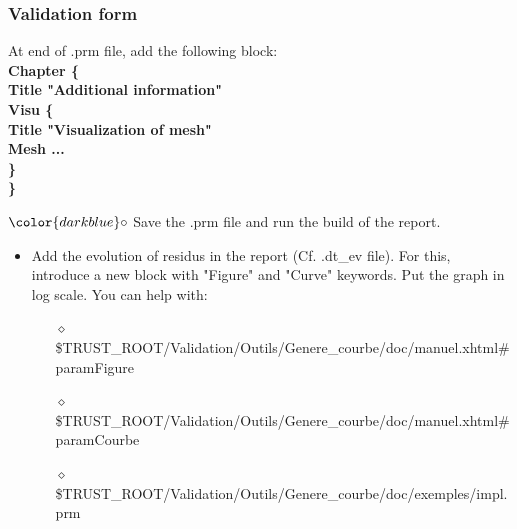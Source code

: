 \documentclass[10pt]{beamer}
\begin{document}
\begin{frame}
\frametitle{Validation form}
\begin{block}{}

\hspace{1.3cm} {\small{At end of .prm file, add the following block:}} \\
{\footnotesize{
\hspace{1.5cm} \textbf{Chapter \{ }  \\
\hspace{1.8cm} \textbf{Title "Additional information"} \\
\hspace{1.8cm} \textbf{Visu \{ } \\
\hspace{2cm} \textbf{Title "Visualization of mesh" } \\
\hspace{2cm} \textbf{Mesh ... } \\
\hspace{1.8cm} \textbf{\} } \\
\hspace{1.5cm} \textbf{\} } \\
}}

\hspace{1cm} $\color{darkblue}\circ$ {\small{ Save the .prm file and run the build of the report.}}

\begin{itemize}
\item Add the evolution of residus in the report (Cf. .dt\_ev file). For this, introduce a new block with "Figure" and "Curve" keywords. Put the graph in log scale.
You can help with:
    \begin{itemize}
    \item [$\diamond$] {\footnotesize{\$TRUST\_ROOT/Validation/Outils/Genere\_courbe/doc/manuel.xhtml\#paramFigure}}
    \item [$\diamond$] {\footnotesize{\$TRUST\_ROOT/Validation/Outils/Genere\_courbe/doc/manuel.xhtml\#paramCourbe}}
    \item [$\diamond$] {\footnotesize{\$TRUST\_ROOT/Validation/Outils/Genere\_courbe/doc/exemples/impl.prm}}
    \end{itemize}

\end{itemize}
\end{block}
\end{frame}
\end{document}
